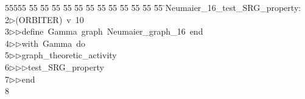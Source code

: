 %
%
\begin{tabbing}
55555 \= 55 \= 55 \= 55 \= 55 \= 55 \= 55 \= 55 \= 55 \= 55 \= 55 \= 55 \= 55 \= \>Neumaier\_16\_test\_SRG\_property:\\[0pt]
2\>$\triangleright$\>(ORBITER)\ v\ 10\ \\[0pt]
3\>$\triangleright$\>$\triangleright$\>define\ Gamma\ graph\ Neumaier\_graph\_16\ end\ \\[0pt]
4\>$\triangleright$\>$\triangleright$\>with\ Gamma\ do\ \\[0pt]
5\>$\triangleright$\>$\triangleright$\>graph\_theoretic\_activity\ \\[0pt]
6\>$\triangleright$\>$\triangleright$\>$\triangleright$\>test\_SRG\_property\ \\[0pt]
7\>$\triangleright$\>$\triangleright$\>end\\[0pt]
8\>\end{tabbing}
